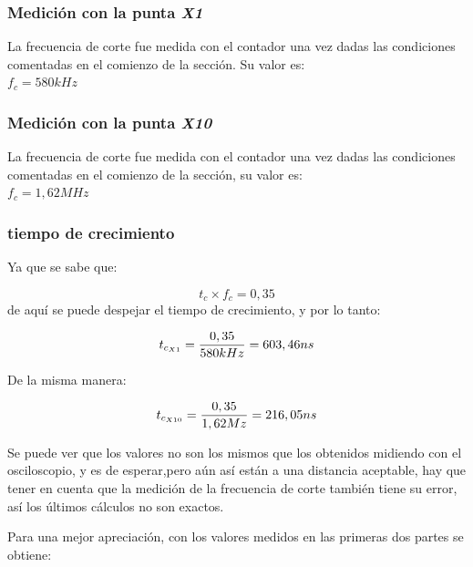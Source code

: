 \documentclass{article}
\begin{document}
\subsubsection{Medición con la punta \textit{X1}}

	La frecuencia de corte fue medida con el contador una vez dadas las condiciones comentadas en el comienzo de la sección. Su valor es: \\

$f_c = 580 kHz$\\


\subsubsection{Medición con la punta \textit{X10}}

	La frecuencia de corte fue medida con el contador una vez dadas las condiciones comentadas en el comienzo de la sección, su valor es:\\

$f_c = 1,62 MHz$\\

\subsubsection{tiempo de crecimiento}

Ya que se sabe que:

\begin{equation}
t_c \times f_c = 0,35
\end{equation}
de aquí se puede despejar el tiempo de crecimiento, y por lo tanto:

\begin{equation}
t_{c_{X1}} = {0,35 \over 580kHz} = 603,46 ns
\end{equation}

De la misma manera:

\begin{equation}
t_{c_{X10}} = {0,35 \over 1,62Mz} = 216,05 ns
\end{equation}

Se puede ver que los valores no son los mismos que los obtenidos midiendo con el osciloscopio, y es de esperar,pero aún así están a una distancia aceptable, hay que tener en cuenta que la medición de la frecuencia de corte también tiene su error, así los últimos cálculos no son exactos.

Para una mejor apreciación, con los valores medidos en las primeras dos partes se obtiene:
\end{document}
